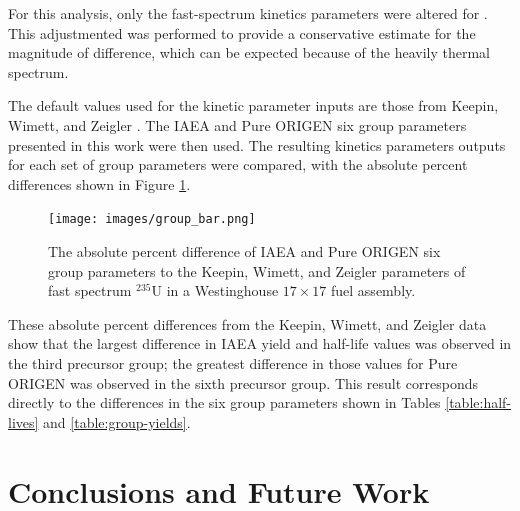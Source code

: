\documentclass{style/nseJournal}
\begin{document}
For this analysis, only the fast-spectrum kinetics parameters were altered for .
This adjustmented was performed to provide a conservative estimate for the magnitude of difference, which can be expected because of the heavily thermal spectrum.

The default values used for the kinetic parameter inputs are those from Keepin, Wimett, and Zeigler \cite{KEEPIN1957IN2}.
The IAEA and Pure ORIGEN six group parameters presented in this work were then used.
The resulting kinetics parameters outputs for each set of group parameters were compared, with the absolute percent differences shown in Figure \ref{fig:Polaris}.

\begin{figure}[]
\centering
\texttt{[image: images/group\_bar.png]}
\caption{The absolute percent difference of IAEA and Pure ORIGEN six group parameters to the Keepin, Wimett, and Zeigler parameters of fast spectrum $^{235}$U in a Westinghouse $17\times17$ fuel assembly.}
\label{fig:Polaris}
\end{figure}

These absolute percent differences from the Keepin, Wimett, and Zeigler data show that the largest difference in IAEA yield and half-life values was observed in the third precursor group; the greatest difference in those values for Pure ORIGEN was observed in the sixth precursor group.
This result corresponds directly to the differences in the six group parameters shown in Tables \ref{table:half-lives} and \ref{table:group-yields}.



\section{Conclusions and Future Work}
\end{document}
